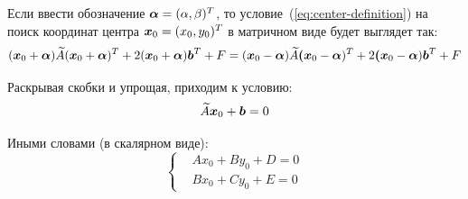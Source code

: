 \documentclass[a4paper,12pt]{article}
\begin{document}
  Если ввести обозначение $\bds \alpha \hm= (\alpha, \beta)^T$, то условие~(\ref{eq:center-definition}) на поиск координат центра $\bds x_0 \hm= (x_0, y_0)^T$ в матричном виде будет выглядет так:
  \[
    (\boldsymbol x_0 + \boldsymbol \alpha) \widetilde A (\boldsymbol x_0 + \boldsymbol \alpha)^T + 2 (\boldsymbol x_0 + \boldsymbol \alpha) \boldsymbol b^T + F
      = (\boldsymbol x_0 - \boldsymbol \alpha) \widetilde A \boldsymbol (\boldsymbol x_0 - \boldsymbol \alpha)^T + 2 \boldsymbol (\boldsymbol x_0 - \boldsymbol \alpha) \boldsymbol b^T + F
  \]
  
  Раскрывая скобки и упрощая, приходим к условию:
  \[
    \widetilde A \boldsymbol x_0 + \boldsymbol b = 0
  \]
  
  Иными словами (в скалярном виде):
  \[
    \left\{
      \begin{aligned}
        &Ax_0 + By_0 + D = 0\\
        &Bx_0 + Cy_0 + E = 0
      \end{aligned}
    \right.
  \]
\end{document}
